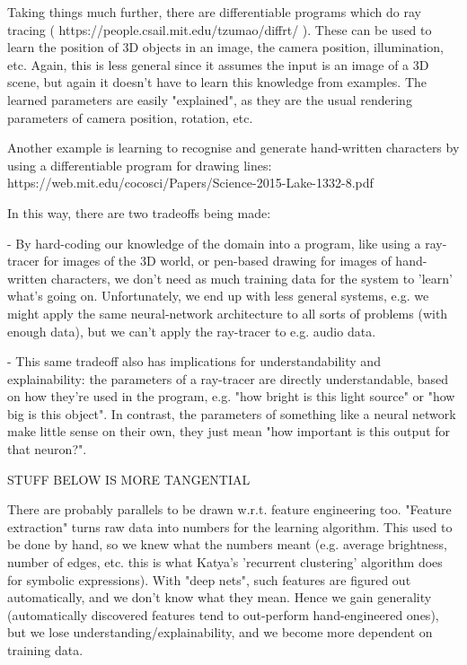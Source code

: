 \documentclass{article}
\begin{document}
Taking things much further, there are differentiable programs which do
ray tracing ( https://people.csail.mit.edu/tzumao/diffrt/ ). These can
be used to learn the position of 3D objects in an image, the camera
position, illumination, etc. Again, this is less general since it
assumes the input is an image of a 3D scene, but again it doesn't have
to learn this knowledge from examples. The learned parameters are easily
"explained", as they are the usual rendering parameters of camera
position, rotation, etc.

Another example is learning to recognise and generate hand-written
characters by using a differentiable program for drawing lines:
https://web.mit.edu/cocosci/Papers/Science-2015-Lake-1332-8.pdf

In this way, there are two tradeoffs being made:

 - By hard-coding our knowledge of the domain into a program, like using
   a ray-tracer for images of the 3D world, or pen-based drawing for
   images of hand-written characters, we don't need as much training
   data for the system to 'learn' what's going on. Unfortunately, we end
   up with less general systems, e.g. we might apply the same
   neural-network architecture to all sorts of problems (with enough
   data), but we can't apply the ray-tracer to e.g. audio data.

 - This same tradeoff also has implications for understandability and
   explainability: the parameters of a ray-tracer are directly
   understandable, based on how they're used in the program, e.g. "how
   bright is this light source" or "how big is this object". In
   contrast, the parameters of something like a neural network make
   little sense on their own, they just mean "how important is this
   output for that neuron?".

STUFF BELOW IS MORE TANGENTIAL

There are probably parallels to be drawn w.r.t. feature engineering
too. "Feature extraction" turns raw data into numbers for the learning
algorithm. This used to be done by hand, so we knew what the numbers
meant (e.g. average brightness, number of edges, etc. this is what
Katya's 'recurrent clustering' algorithm does for symbolic expressions).
With "deep nets", such features are figured out automatically, and we
don't know what they mean. Hence we gain generality (automatically
discovered features tend to out-perform hand-engineered ones), but we
lose understanding/explainability, and we become more dependent on
training data.
\end{document}
